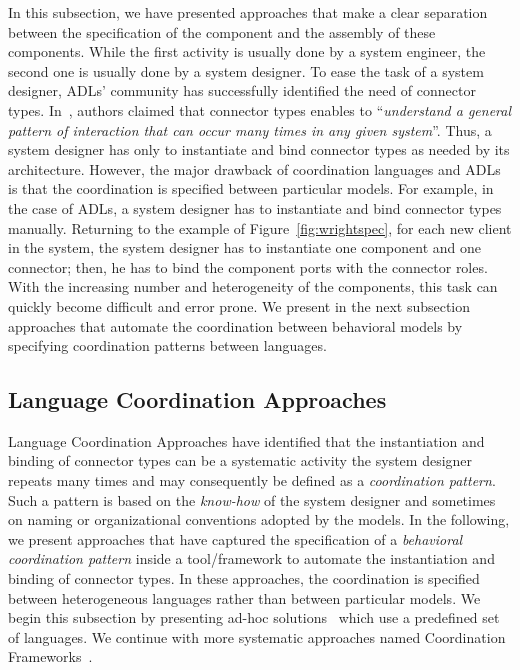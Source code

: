 In this subsection, we have presented approaches that make a clear separation between the specification of the component and the assembly of these components. While the first activity is usually done by a system engineer, the second one is usually done by a system designer. To ease the task of a system designer, ADLs' community has successfully identified the need of connector types. In~\cite{wrightbib}, authors claimed that connector types enables to ``\emph{understand a general pattern of interaction that can occur many times in any given system}''. Thus, a system designer has only to instantiate and bind connector types as needed by its architecture. However, the major drawback of coordination languages and ADLs is that the coordination is specified between particular models. For example, in the case of ADLs, a system designer has to instantiate and bind connector types manually. Returning to the example of Figure~\ref{fig:wrightspec}, for each new client in the system, the system designer has to instantiate one component and one connector; then, he has to bind the component ports with the connector roles. With the increasing number and heterogeneity of the components, this task can quickly become difficult and error prone. We present in the next subsection approaches that automate the coordination between behavioral models by specifying coordination patterns between languages.

\subsection{Language Coordination Approaches}
Language Coordination Approaches have identified that the instantiation and binding of connector types can be a systematic activity the system designer repeats many times and may consequently be defined as a \emph{coordination pattern}. Such a pattern is based on the \emph{know-how} of the system designer and sometimes on naming or organizational conventions adopted by the models. In the following, we present approaches that have captured the specification of a \emph{behavioral coordination pattern} inside a tool/framework to automate the instantiation and binding of connector types. In these approaches, the coordination is specified between heterogeneous languages rather than between particular models. We begin this subsection by presenting ad-hoc solutions~\cite{mascotbib, dinatale} which use a predefined set of languages. We continue with more systematic approaches named Coordination Frameworks~\cite{modhelxbib,ptoleframebib}.

